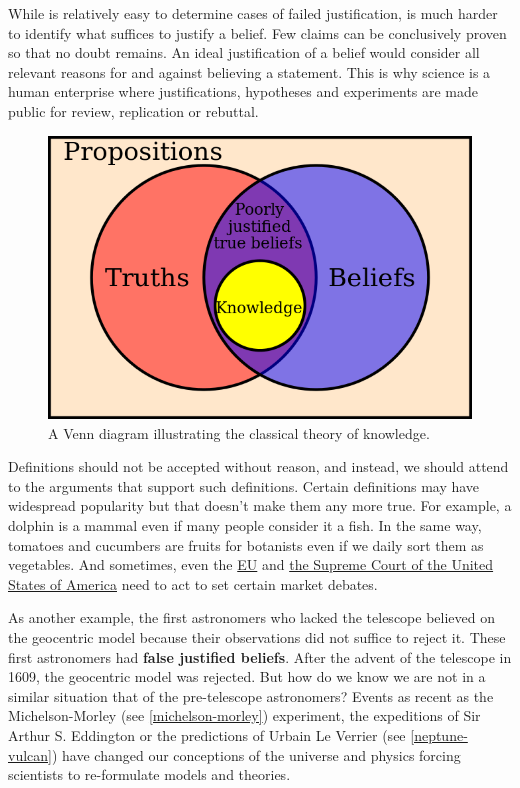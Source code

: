 \documentclass[
]{book}
\begin{document}
While is relatively easy to determine cases of failed justification, is much harder to identify what suffices to justify a belief. Few claims can be conclusively proven so that no doubt remains. An ideal justification of a belief would consider all relevant reasons for and against believing a statement. This is why science is a human enterprise where justifications, hypotheses and experiments are made public for review, replication or rebuttal.

\begin{figure}

{\centering \includegraphics[width=0.5\linewidth]{Figures/plato_knowledge} 

}

\caption{A Venn diagram illustrating the classical theory of knowledge.}\label{fig:plato-knowledge}
\end{figure}

Definitions should not be accepted without reason, and instead, we should attend to the arguments that support such definitions. Certain definitions may have widespread popularity but that doesn't make them any more true. For example, a dolphin is a mammal even if many people consider it a fish. In the same way, tomatoes and cucumbers are fruits for botanists even if we daily sort them as vegetables. And sometimes, even the \href{https://eur-lex.europa.eu/LexUriServ/LexUriServ.do?uri=CELEX:32001L0113:En:HTML\#d1e32-72-1}{EU} and \href{https://www.nationalgeographic.com/culture/article/fruit-or-vegetable}{the Supreme Court of the United States of America} need to act to set certain market debates.

As another example, the first astronomers who lacked the telescope believed on the geocentric model because their observations did not suffice to reject it. These first astronomers had \textbf{false justified beliefs}. After the advent of the telescope in 1609, the geocentric model was rejected. But how do we know we are not in a similar situation that of the pre-telescope astronomers? Events as recent as the Michelson-Morley (see \ref{michelson-morley}) experiment, the expeditions of Sir Arthur S. Eddington or the predictions of Urbain Le Verrier (see \ref{neptune-vulcan}) have changed our conceptions of the universe and physics forcing scientists to re-formulate models and theories.
\end{document}
